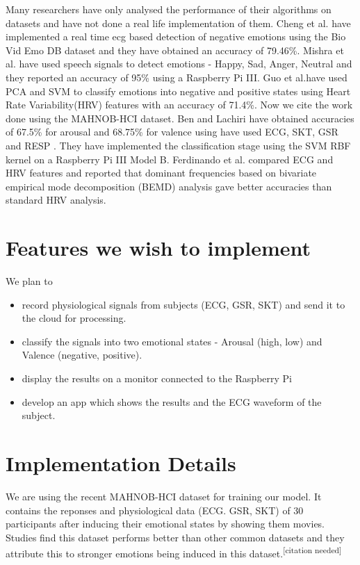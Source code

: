 \documentclass[11pt]{article}
\theoremstyle{definition}
\begin{document}
    Many researchers have only analysed the performance of their algorithms on datasets and have not done a real life implementation of them.
    Cheng et al.\cite{cheng_novel_2017} have implemented a real time ecg based detection of negative emotions using the Bio Vid Emo DB dataset and they have obtained an accuracy of 79.46\%. 
    Mishra et al.\cite{mishra_real_2017} have used speech signals to detect emotions - Happy, Sad, Anger, Neutral and they reported an accuracy of 95\% using a Raspberry Pi III.
    Guo et al.\cite{guo_heart_2016}have used PCA and SVM to classify emotions into negative and positive states using Heart Rate Variability(HRV) features with an accuracy of 71.4\%.
    Now we cite the work done using the MAHNOB-HCI dataset\cite{soleymani_multimodal_2012}. 
    Ben and Lachiri\cite{ben_emotion_2017} have obtained accuracies of 67.5\% for arousal and 68.75\% for valence using have used ECG, SKT, GSR and RESP . They have implemented the classification stage using the SVM RBF kernel on a Raspberry Pi III Model B.
    Ferdinando et al.\cite{ferdinando_comparing_2016} compared ECG and HRV features and reported that dominant frequencies based on
    bivariate empirical mode decomposition (BEMD) analysis gave better accuracies than standard HRV analysis.
   
  \section{Features we wish to implement}
    We plan to 
    \begin{itemize}
      \item record physiological signals from subjects (ECG, GSR, SKT) and send it to the cloud for processing.
      \item classify the signals into two emotional states - Arousal (high, low) and Valence (negative, positive)\cite{ben_emotion_2017}.
      \item display the results on a monitor connected to the Raspberry Pi
      \item develop an app which shows the results and the ECG waveform of the subject.
    \end{itemize}

  \section{Implementation Details}
    We are using the recent MAHNOB-HCI dataset\cite{soleymani_multimodal_2012} for training our model.
    It contains the reponses and physiological data (ECG. GSR, SKT) of 30 participants after inducing their emotional states by showing them movies. 
    Studies find this dataset performs better than other common datasets and they attribute this to stronger emotions being induced in this dataset.\textsuperscript{[citation needed]}
\end{document}
